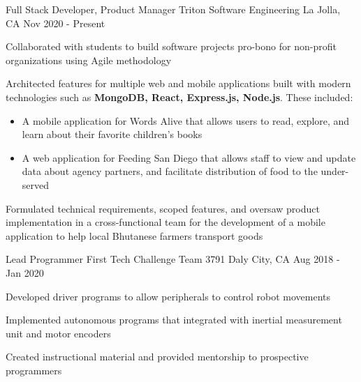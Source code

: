 \begin{cventries}
  \cventry
  {Full Stack Developer, Product Manager} %
  {Triton Software Engineering} %
  {La Jolla, CA} %
  {Nov 2020 - Present} %
  {\begin{cvitems} %
      \item {Collaborated with students to build software projects pro-bono for non-profit organizations using Agile methodology}
      \item {Architected features for multiple web and mobile applications built with modern technologies such as \textbf{MongoDB, React, Express.js, Node.js}. These included: }
      \begin{itemize}
        \item{A mobile application for Words Alive that allows users to read, explore, and learn about their favorite children’s books } \href{https://github.com/TritonSE/WA-Family-Literacy-Application}{\faExternalLink}
        \item{A web application for Feeding San Diego that allows staff to view and update data about agency partners, and facilitate distribution of food to the under-served } \href{https://github.com/TritonSE/FSD-Distribution-Web-App}{\faExternalLink}
      \end{itemize}
      \item { Formulated technical requirements, scoped features, and oversaw product implementation in a cross-functional team for the development of a mobile application to help local Bhutanese farmers transport goods } \href{https://github.com/TritonSE/LAK-Goods-Transport-Application}{\faExternalLink}
    \end{cvitems}
  }
  \cventry
  {Lead Programmer} %
  {First Tech Challenge Team 3791} %
  {Daly City, CA} %
  {Aug 2018 - Jan 2020} %
  {\begin{cvitems} %
      \item {Developed driver programs to allow peripherals to control robot movements}
      \item{Implemented autonomous programs that integrated with inertial measurement unit and motor encoders}
      \item{Created instructional material and provided mentorship to prospective programmers}
    \end{cvitems}
  }

\end{cventries}
